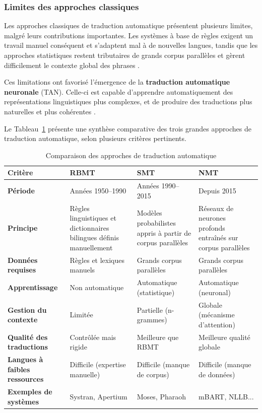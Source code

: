 \subsubsection{Limites des approches classiques}

Les approches classiques de traduction automatique présentent plusieurs limites, malgré leurs contributions importantes. Les systèmes à base de règles exigent un travail manuel conséquent et s'adaptent mal à de nouvelles langues, tandis que les approches statistiques restent tributaires de grands corpus parallèles et gèrent difficilement le contexte global des phrases \cite{ranathunga2023neural}.

Ces limitations ont favorisé l'émergence de la \textbf{traduction automatique neuronale} (\ac{TAN}). Celle-ci est capable d'apprendre automatiquement des représentations linguistiques plus complexes, et de produire des traductions plus naturelles et plus cohérentes \cite{vaswani2017attention}.

Le Tableau~\ref{tab:comparaison_ta} présente une synthèse comparative des trois grandes approches de traduction automatique, selon plusieurs critères pertinents.

\begin{table}[H]
\centering
\renewcommand{\arraystretch}{1.5}
\begin{tabular}{p{3.2cm}p{3.5cm}p{3.5cm}p{3.5cm}}
\toprule
\textbf{Critère} & \textbf{\ac{RBMT}} & \textbf{\ac{SMT}} & \textbf{\ac{NMT}} \\
\midrule
\textbf{Période} & Années 1950--1990 & Années 1990--2015 & Depuis 2015 \\
\textbf{Principe} & Règles linguistiques et dictionnaires bilingues définis manuellement & Modèles probabilistes appris à partir de corpus parallèles & Réseaux de neurones profonds entraînés sur corpus parallèles \\
\textbf{Données requises} & Règles et lexiques manuels & Grands corpus parallèles & Grands corpus parallèles \\
\textbf{Apprentissage} & Non automatique & Automatique (statistique) & Automatique (neuronal) \\
\textbf{Gestion du contexte} & Limitée & Partielle (n-grammes) & Globale (mécanisme d'attention) \\
\textbf{Qualité des traductions} & Contrôlée mais rigide & Meilleure que \ac{RBMT} & Meilleure qualité globale \\
\textbf{Langues à faibles ressources} & Difficile (expertise manuelle) & Difficile (manque de corpus) & Difficile (manque de données) \\
\textbf{Exemples de systèmes} & Systran, Apertium & Moses, Pharaoh & mBART, NLLB... \\
\bottomrule
\end{tabular}
\caption{Comparaison des approches de traduction automatique}
\label{tab:comparaison_ta}
\end{table}

